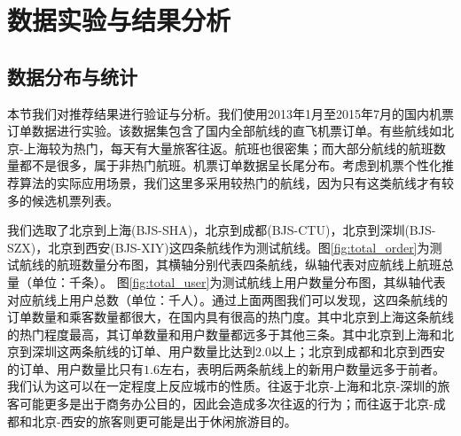 \section{数据实验与结果分析}

\subsection{数据分布与统计}
本节我们对推荐结果进行验证与分析。我们使用2013年1月至2015年7月的国内机票订单数据进行实验。该数据集包含了国内全部航线的直飞机票订单。有些航线如北京-上海较为热门，每天有大量旅客往返。航班也很密集；而大部分航线的航班数量都不是很多，属于非热门航班。机票订单数据呈长尾分布。考虑到机票个性化推荐算法的实际应用场景，我们这里多采用较热门的航线，因为只有这类航线才有较多的候选机票列表。

\begin{figure}
\centering
{}
\end{figure}\par

我们选取了北京到上海(BJS-SHA)，北京到成都(BJS-CTU)，北京到深圳(BJS-SZX)，北京到西安(BJS-XIY)这四条航线作为测试航线。图\ref{fig:total_order}为测试航线的航班数量分布图，其横轴分别代表四条航线，纵轴代表对应航线上航班总量（单位：千条）。
图\ref{fig:total_user}为测试航线上用户数量分布图，其纵轴代表对应航线上用户总数（单位：千人）。通过上面两图我们可以发现，这四条航线的订单数量和乘客数量都很大，在国内具有很高的热门度。其中北京到上海这条航线的热门程度最高，其订单数量和用户数量都远多于其他三条。其中北京到上海和北京到深圳这两条航线的订单、用户数量比达到$2.0$以上；北京到成都和北京到西安的订单、用户数量比只有$1.6$左右，表明后两条航线上的新用户数量远多于前者。我们认为这可以在一定程度上反应城市的性质。往返于北京-上海和北京-深圳的旅客可能更多是出于商务办公目的，因此会造成多次往返的行为；而往返于北京-成都和北京-西安的旅客则更可能是出于休闲旅游目的。\par

\begin{figure}
\centering
{}
\end{figure}\par

